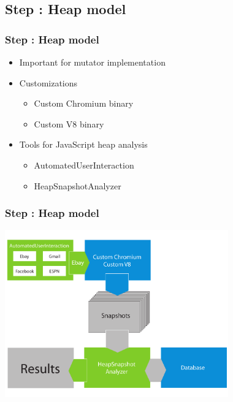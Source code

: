 \documentclass[xcolor=x11names,compress]{beamer}
\begin{document}
	\subsection{Step \theStepCounter: Heap model}
	\begin{frame}
		\frametitle{Step \theStepCounter: Heap model}
		\begin{itemize}
			\item Important for mutator implementation
			\item Customizations
			\begin{itemize}
				\item Custom Chromium binary
				\item Custom V8 binary
			\end{itemize}
			
			\pause
			
			\item Tools for JavaScript heap analysis
			\begin{itemize}
				\item AutomatedUserInteraction
				\item HeapSnapshotAnalyzer
			\end{itemize}
		\end{itemize}
	\end{frame}
	
	\begin{frame}
		\frametitle{Step \theStepCounter: Heap model}		
		\includegraphics[width=26em]{./imgs/solution_h.pdf}
	\end{frame}
\end{document}
